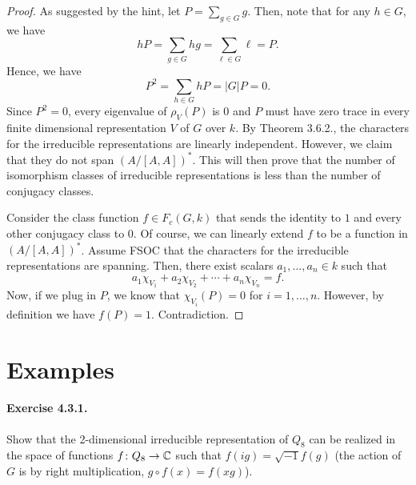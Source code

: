 \documentclass[oneside]{scrbook}
\begin{document}
\begin{proof}
As suggested by the hint, let $P=\sum_{g\in G}g$. Then, note that for any $h\in G$, we have
\[hP=\sum_{g\in G}hg=\sum_{\ell \in G}\ell=P.\]
Hence, we have
\[P^2=\sum_{h\in G}hP=|G|P=0.\]
Since $P^2=0$, every eigenvalue of $\rho_V(P)$ is $0$ and $P$ must have zero trace in every finite dimensional representation $V$ of $G$ over $k$. By Theorem 3.6.2., the characters for the irreducible representations are linearly independent. However, we claim that they do not span $(A/[A,A])^*$. This will then prove that the number of isomorphism classes of irreducible representations is less than the number of conjugacy classes. 

Consider the class function $f\in F_c(G,k)$ that sends the identity to $1$ and every other conjugacy class to $0$. Of course, we can linearly extend $f$ to be a function in $(A/[A,A])^*$. Assume FSOC that the characters for the irreducible representations are spanning. Then, there exist scalars $a_1,\ldots,a_n\in k$ such that
\[a_1\chi_{V_1}+a_2\chi_{V_2}+\cdots+a_n\chi_{V_n}=f.\]
Now, if we plug in $P$, we know that $\chi_{V_i}(P)=0$ for $i=1,\ldots,n$. However, by definition we have $f(P)=1$. Contradiction.
\end{proof}

\section{Examples}
\paragraph{Exercise 4.3.1.} Show that the 2-dimensional irreducible representation of $Q_8$ can be realized in the space of functions $f\colon Q_8\to \mathbb C$ such that $f(ig) = \sqrt{-1}f(g)$ (the action of $G$ is by right multiplication, $g\circ f(x) = f(xg)$).
\end{document}
